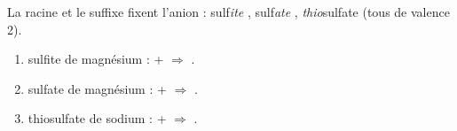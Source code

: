 \documentclass[11pt,a4paper]{article}
\begin{document}
\begin{corrige}
La racine et le suffixe fixent l'anion : sulf\emph{ite} , sulf\emph{ate} ,
\emph{thio}sulfate  (tous de valence 2).
\begin{enumerate}[label=\alph*)]
  \item sulfite de magnésium :  +  $\Rightarrow$ .
  \item sulfate de magnésium :  +  $\Rightarrow$ .
  \item thiosulfate de sodium :  +  $\Rightarrow$ .
\end{enumerate}
\end{corrige}
\end{document}
